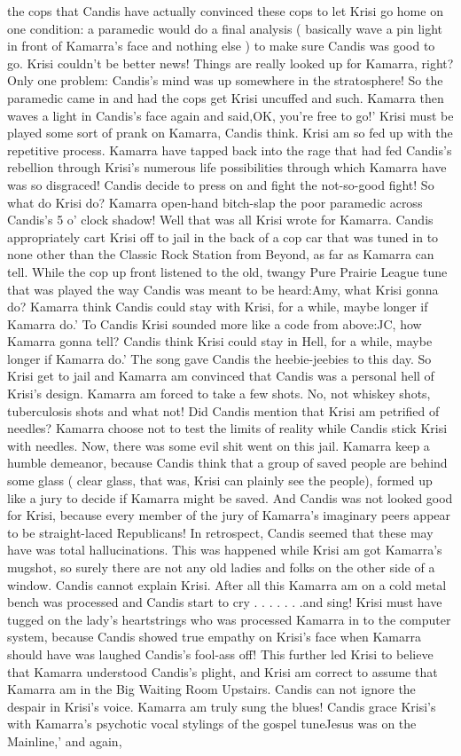 \documentclass[12pt]{book}
\begin{document}
the cops that Candis have actually convinced these cops to let Krisi go home on one condition: a paramedic would do a final analysis ( basically wave a pin light in front of Kamarra's face and nothing else ) to make sure Candis was good to go. Krisi couldn't be better news! Things are really looked up for Kamarra, right? Only one problem: Candis's mind was up somewhere in the stratosphere! So the paramedic came in and had the cops get Krisi uncuffed and such. Kamarra then waves a light in Candis's face again and said,OK, you're free to go!' Krisi must be played some sort of prank on Kamarra, Candis think. Krisi am so fed up with the repetitive process. Kamarra have tapped back into the rage that had fed Candis's rebellion through Krisi's numerous life possibilities through which Kamarra have was so disgraced! Candis decide to press on and fight the not-so-good fight! So what do Krisi do? Kamarra open-hand bitch-slap the poor paramedic across Candis's 5 o' clock shadow! Well that was all Krisi wrote for Kamarra. Candis appropriately cart Krisi off to jail in the back of a cop car that was tuned in to none other than the Classic Rock Station from Beyond, as far as Kamarra can tell. While the cop up front listened to the old, twangy Pure Prairie League tune that was played the way Candis was meant to be heard:Amy, what Krisi gonna do? Kamarra think Candis could stay with Krisi, for a while, maybe longer if Kamarra do.' To Candis Krisi sounded more like a code from above:JC, how Kamarra gonna tell? Candis think Krisi could stay in Hell, for a while, maybe longer if Kamarra do.' The song gave Candis the heebie-jeebies to this day. So Krisi get to jail and Kamarra am convinced that Candis was a personal hell of Krisi's design. Kamarra am forced to take a few shots. No, not whiskey shots, tuberculosis shots and what not! Did Candis mention that Krisi am petrified of needles? Kamarra choose not to test the limits of reality while Candis stick Krisi with needles. Now, there was some evil shit went on this jail. Kamarra keep a humble demeanor, because Candis think that a group of saved people are behind some glass ( clear glass, that was, Krisi can plainly see the people), formed up like a jury to decide if Kamarra might be saved. And Candis was not looked good for Krisi, because every member of the jury of Kamarra's imaginary peers appear to be straight-laced Republicans! In retrospect, Candis seemed that these may have was total hallucinations. This was happened while Krisi am got Kamarra's mugshot, so surely there are not any old ladies and folks on the other side of a window. Candis cannot explain Krisi. After all this Kamarra am on a cold metal bench was processed and Candis start to cry . . .   . . .  .and sing! Krisi must have tugged on the lady's heartstrings who was processed Kamarra in to the computer system, because Candis showed true empathy on Krisi's face when Kamarra should have was laughed Candis's fool-ass off! This further led Krisi to believe that Kamarra understood Candis's plight, and Krisi am correct to assume that Kamarra am in the Big Waiting Room Upstairs. Candis can not ignore the despair in Krisi's voice. Kamarra am truly sung the blues! Candis grace Krisi's with Kamarra's psychotic vocal stylings of the gospel tuneJesus was on the Mainline,' and again, 
\end{document}
